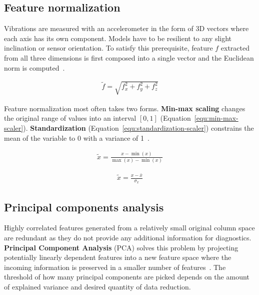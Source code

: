 \subsection{Feature normalization}
Vibrations are measured with an accelerometer in the form of 3D vectors where each axis has its own component. Models have to be resilient to any slight inclination or sensor orientation. To satisfy this prerequisite, feature $f$ extracted from all three dimensions is first composed into a single vector and the Euclidean norm is computed~\cite{kamminga_robust_2018}.

\begin{ceqn}\begin{align}
\widetilde{f} = \sqrt{f_x^2 + f_y^2 + f_z^2}
\end{align}\end{ceqn}

Feature normalization most often takes two forms. \textbf{Min-max scaling} changes the original range of values into an interval $[0, 1]$ (Equation~\ref{equ:min-max-scaler}). \textbf{Standardization} (Equation~\ref{equ:standardization-scaler}) constrains the mean of the variable to 0 with a variance of 1~\cite{zheng_feature_2018}.

\begin{ceqn}\begin{align}
\widetilde{x} = \frac{x - \min(x)}{\max(x) - \min(x)}
\label{equ:min-max-scaler}
\end{align}\end{ceqn}

\begin{ceqn}\begin{align}
\widetilde{x} = \frac{x - \bar{x}}{\sigma_x}
\label{equ:standardization-scaler}
\end{align}\end{ceqn}


\subsection{Principal components analysis}
Highly correlated features generated from a relatively small original column space are redundant as they do not provide any additional information for diagnostics. \textbf{Principal Component Analysis} (PCA) solves this problem by projecting potentially linearly dependent features into a new feature space where the incoming information is preserved in a smaller number of features~\cite{zheng_feature_2018}. The threshold of how many principal components are picked depends on the amount of explained variance and desired quantity of data reduction.

